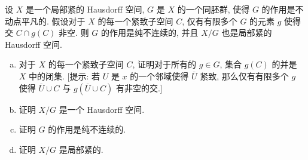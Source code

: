 \begin{exercise}
\label{exercise:ch13-sec81-06}
\begin{theorem}
设 $X$ 是一个局部紧的 Hausdorff 空间, $G$ 是 $X$ 的一个同胚群, 使得 $G$ 的作用是不动点平凡的. 假设对于 $X$ 的每一个紧致子空间 $C$, 仅有有限多个 $G$ 的元素 $g$ 使得交 $C\cap g(C)$ 非空. 则 $G$ 的作用是纯不连续的, 并且 $X/G$ 也是局部紧的 Hausdorff 空间.
\end{theorem}
\begin{enumerate}[(a)]
\item 对于 $X$ 的每一个紧致子空间 $C$, 证明对于所有的 $g\in G$, 集合 $g(C)$ 的并是 $X$ 中的闭集. [提示: 若 $U$ 是 $x$ 的一个邻域使得 $\overline{U}$ 紧致, 那么仅有有限多个 $g$ 使得 $\overline{U}\cup C$ 与 $g(\overline{U}\cup C)$ 有非空的交.]
\item 证明 $X/G$ 是一个 Hausdorff 空间.
\item 证明 $G$ 的作用是纯不连续的.
\item 证明 $X/G$ 是局部紧的.
\end{enumerate}
\end{exercise}

